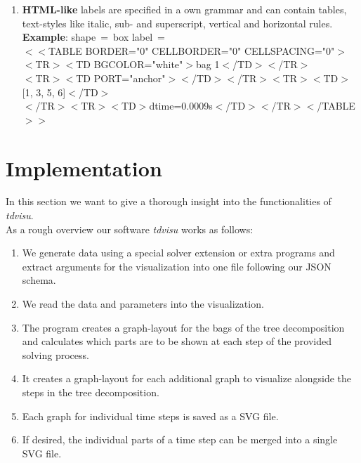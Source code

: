 \documentclass[a4paper, 12pt, bibliography=totoc]{scrartcl}
\begin{document}
\begin{itemize}
\begin{enumerate}[label=(\arabic*)]
		\item \textbf{HTML-like} labels are specified in a own grammar and can contain tables, text-styles like italic, sub- and superscript, vertical and horizontal rules.\vspace{10pt}\\		
		\textbf{Example}: shape~=~box label~=\vspace{5pt}\\
		$<<$TABLE BORDER="0" CELLBORDER="0" CELLSPACING="0"$>$\\
		$<$TR$><$TD BGCOLOR="white"$>$bag 1$<$/TD$><$/TR$>$\\
		$<$TR$><$TD PORT="anchor"$>$$<$/TD$><$/TR$><$TR$><$TD$>$[1, 3, 5, 6]$<$/TD$>$\\ $<$/TR$><$TR$><$TD$>$dtime=0.0009s$<$/TD$><$/TR$><$/TABLE$>>$
	\end{enumerate}
\end{itemize}


\newpage
\section{Implementation}\label{sec:project}

In this section we want to give a thorough insight into the functionalities of \textit{tdvisu}.\\

\noindent As a rough overview our software \textit{tdvisu} works as follows:

\begin{enumerate}
	\item We generate data using a special solver extension or extra programs and extract arguments for the visualization into one file following our JSON schema.
	\item We read the data and parameters into the visualization.
	\item The program creates a graph-layout for the bags of the tree decomposition and calculates which parts are to be shown at each step of the provided solving process.
	\item It creates a graph-layout for each additional graph to visualize alongside the steps in the tree decomposition.
	\item Each graph for individual time steps is saved as a SVG file.
	\item If desired, the individual parts of a time step can be merged into a single SVG file.
\end{enumerate}
\end{document}
